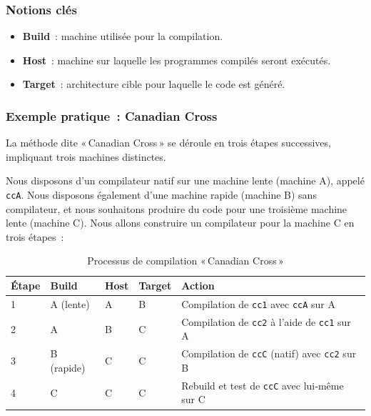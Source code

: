 \subsubsection{Notions clés}
\begin{itemize}
  \item \textbf{Build} : machine utilisée pour la compilation.
  \item \textbf{Host} : machine sur laquelle les programmes compilés seront exécutés.
  \item \textbf{Target} : architecture cible pour laquelle le code est généré.
\end{itemize}


\subsubsection{Exemple pratique : Canadian Cross}
La méthode dite « Canadian Cross » se déroule en trois étapes successives, impliquant trois machines distinctes.

Nous disposons d'un compilateur natif sur une machine lente (machine A), appelé \texttt{ccA}. Nous disposons également d'une machine rapide (machine B) sans compilateur, et nous souhaitons produire du code pour une troisième machine lente (machine C). Nous allons construire un compilateur pour la machine C en trois étapes :

\begin{table}[!htbp]
  \centering
  \caption{Processus de compilation « Canadian Cross »}
  \label{tab:canadian-cross}
  \begin{tabular}{|l|l|l|l|p{6cm}|}
    \hline
    \textbf{Étape} & \textbf{Build}    & \textbf{Host}    & \textbf{Target}  & \textbf{Action}                                      \\
    \hline
    1              & A (lente)         & A                & B                & Compilation de \texttt{cc1}  avec \texttt{ccA} sur A    \\
    \hline
    2              & A                 & B                & C                & Compilation de \texttt{cc2} à l’aide de \texttt{cc1} sur A                \\
    \hline
    3              & B (rapide)        & C                & C                & Compilation de \texttt{ccC} (natif) avec \texttt{cc2} sur B                \\
    \hline
    4              & C                 & C                & C                & Rebuild et test de \texttt{ccC} avec lui‑même sur C                      \\
    \hline
  \end{tabular}
\end{table}

